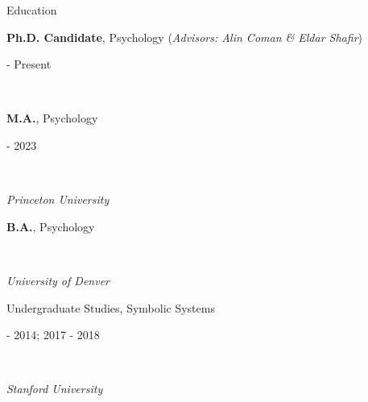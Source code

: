 \documentclass{cv} %
\begin{document}
\nocite{*}


\begin{cvSection}{Education}

\begin{minipage}[t]{0.80\linewidth}
    \raggedright \textbf{Ph.D. Candidate}, Psychology (\textit{Advisors: Alin Coman \& Eldar Shafir})%
\end{minipage}
\hfill
\begin{minipage}[t]{0.15\linewidth}
     - Present%
\end{minipage}
\\
\begin{minipage}[t]{0.50\linewidth}
    \raggedright \textbf{M.A.}, Psychology%
\end{minipage}
\hfill
\begin{minipage}[t]{0.45\linewidth}
     - 2023
\end{minipage}
\\
\begin{minipage}[t]{0.80\linewidth}
    \raggedright \textit{Princeton University}%
\end{minipage}
\hfill
\begin{minipage}[t]{0.15\linewidth}
%
\end{minipage}


\begin{minipage}[t]{0.50\linewidth}
    \raggedright \textbf{B.A.}, Psychology%
\end{minipage}
\hfill
\begin{minipage}[t]{0.45\linewidth}
\end{minipage}
\\
\begin{minipage}[t]{0.50\linewidth}
    \raggedright \textit{University of Denver}%
\end{minipage}
\hfill
\begin{minipage}[t]{0.45\linewidth}
\end{minipage}

\begin{minipage}[t]{0.50\linewidth}
    \raggedright Undergraduate Studies, Symbolic Systems%
\end{minipage}
\hfill
\begin{minipage}[t]{0.45\linewidth}
     - 2014; 2017 - 2018%
\end{minipage}
\\
\begin{minipage}[t]{0.50\linewidth}
    \raggedright \textit{Stanford University}%
\end{minipage}
\hfill
\begin{minipage}[t]{0.45\linewidth}
\end{minipage}

\end{cvSection}
\end{document}
